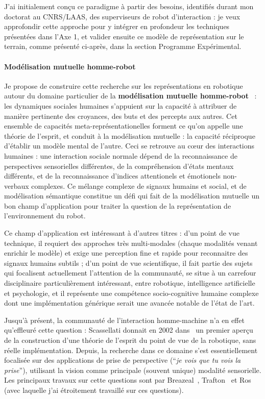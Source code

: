 \documentclass[a4paper]{article}
\begin{document}
J'ai initialement conçu ce paradigme à partir des besoins, identifiés durant
mon doctorat au CNRS/LAAS, des superviseurs de robot d'interaction : je veux
approfondir cette approche pour y intégrer en profondeur les techniques
présentées dans l'Axe 1, et valider ensuite ce modèle de représentation sur le
terrain, comme présenté ci-après, dans la section Programme Expérimental.

\paragraph{Modélisation mutuelle homme-robot}


Je propose de construire cette recherche sur les représentations en robotique
autour du domaine particulier de la \textbf{modélisation mutuelle
homme-robot}~\cite{lemaignan2015mutual} :
les dynamiques sociales humaines s'appuient sur la capacité à attribuer de
manière pertinente des croyances, des buts et des percepts aux autres. Cet
ensemble de capacités meta-représentationelles forment ce qu'on appelle une
théorie de l'esprit, et conduit à la modélisation mutuelle : la capacité
réciproque d'établir un modèle mental de l'autre. Ceci se retrouve au c\oe ur
des interactions humaines : une interaction sociale normale dépend de la
reconnaissance de perspectives sensorielles différentes, de la compréhension
d'états mentaux différents, et de la reconnaissance d'indices attentionels et
émotionels non-verbaux complexes.  Ce mélange complexe de signaux humains et
social, et de modélisation sémantique constitue un défi qui fait de la
modélisation mutuelle un bon champ d'application pour traiter la question de la
représentation de l'environnement du robot.

Ce champ d'application est intéressant à d'autres titres : d'un point de vue
technique, il requiert des approches très multi-modales (chaque modalités venant
enrichir le modèle) et exige une perception fine et rapide pour reconnaitre des
signaux humains subtils ; d'un point de vue scientifique, il fait partie des
sujets qui focalisent actuellement l'attention de la communauté, se situe à un
carrefour disciplinaire particulièrement intéressant, entre robotique,
intelligence artificielle et psychologie, et il représente une compétence
socio-cognitive humaine complexe dont une implémentation générique serait une
avancée notable de l'état de l'art.

Jusqu'à présent, la communauté de l'interaction homme-machine n'a en effet
qu'effleuré cette question : Scassellati donnait en 2002
dans~\cite{scassellati2002theory} un premier aperçu de la construction d'une
théorie de l'esprit du point de vue de la robotique, sans réelle implémentation.
Depuis, la recherche dans ce domaine s'est essentiellement focalisée sur des
applications de prise de perspective (``\emph{je vois que tu vois la prise}''),
utilisant la vision comme principale (souvent unique) modalité sensorielle. Les
principaux travaux sur cette questions sont par
Breazeal~\cite{breazeal2006using}, Trafton~\cite{Trafton2005} et
Ros~\cite{Ros2010} (avec laquelle j'ai étroitement travaillé sur ces questions).
\end{document}

